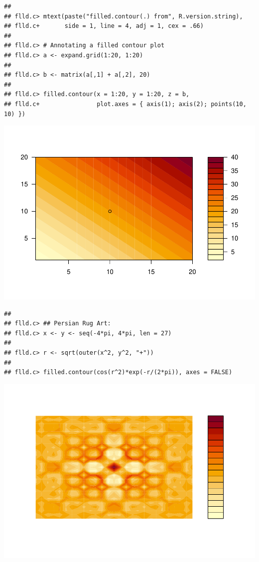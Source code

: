 \documentclass[
]{book}
\begin{document}
\begin{verbatim}
## 
## flld.c> mtext(paste("filled.contour(.) from", R.version.string),
## flld.c+       side = 1, line = 4, adj = 1, cex = .66)
## 
## flld.c> # Annotating a filled contour plot
## flld.c> a <- expand.grid(1:20, 1:20)
## 
## flld.c> b <- matrix(a[,1] + a[,2], 20)
## 
## flld.c> filled.contour(x = 1:20, y = 1:20, z = b,
## flld.c+                plot.axes = { axis(1); axis(2); points(10, 10) })
\end{verbatim}

\includegraphics{TudodoR_files/figure-latex/unnamed-chunk-145-6.pdf}

\begin{verbatim}
## 
## flld.c> ## Persian Rug Art:
## flld.c> x <- y <- seq(-4*pi, 4*pi, len = 27)
## 
## flld.c> r <- sqrt(outer(x^2, y^2, "+"))
## 
## flld.c> filled.contour(cos(r^2)*exp(-r/(2*pi)), axes = FALSE)
\end{verbatim}

\includegraphics{TudodoR_files/figure-latex/unnamed-chunk-145-7.pdf}
\end{document}

